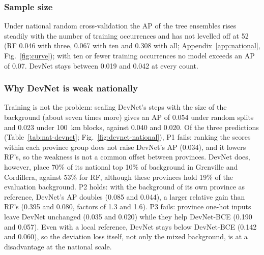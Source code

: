 \documentclass[pdflatex,sn-apa]{sn-jnl}
\begin{document}
\subsubsection{Sample size}\label{sec:res-curve}

Under national random cross-validation the AP of the tree ensembles rises steadily with the number of training occurrences and has not levelled off at 52 (RF 0.046 with three, 0.067 with ten and 0.308 with all; Appendix~\ref{app:national}, Fig.~\ref{fig:curve}); with ten or fewer training occurrences no model exceeds an AP of 0.07. DevNet stays between 0.019 and 0.042 at every count.

\subsubsection{Why DevNet is weak nationally}\label{sec:res-devnet-national}

Training is not the problem: scaling DevNet's steps with the size of the background (about seven times more) gives an AP of 0.054 under random splits and 0.023 under 100~km blocks, against 0.040 and 0.020. Of the three predictions (Table~\ref{tab:nat-devnet}; Fig.~\ref{fig:devnet-national}), P1 fails: ranking the scores within each province group does not raise DevNet's AP (0.034), and it lowers RF's, so the weakness is not a common offset between provinces. DevNet does, however, place 70\% of its national top 10\% of background in Grenville and Cordillera, against 53\% for RF, although these provinces hold 19\% of the evaluation background. P2 holds: with the background of its own province as reference, DevNet's AP doubles (0.085 and 0.044), a larger relative gain than RF's (0.395 and 0.080, factors of 1.3 and 1.6). P3 fails: province one-hot inputs leave DevNet unchanged (0.035 and 0.020) while they help DevNet-BCE (0.190 and 0.057). Even with a local reference, DevNet stays below DevNet-BCE (0.142 and 0.060), so the deviation loss itself, not only the mixed background, is at a disadvantage at the national scale.
\end{document}
